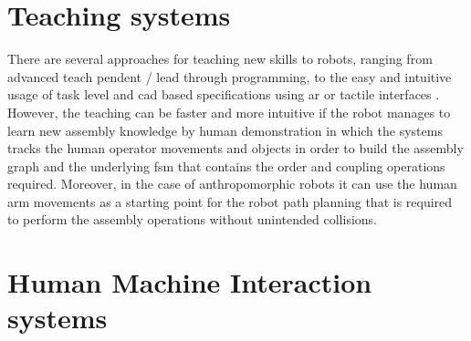 \section{Teaching systems}

There are several approaches for teaching new skills to robots, ranging from advanced teach pendent / lead through programming, to the easy and intuitive usage of task level and \gls{cad} based specifications using \gls{ar} or tactile interfaces \cite{Perzylo2015a}. However, the teaching can be faster and more intuitive if the robot manages to learn new assembly knowledge \cite{tensorflow} by human demonstration \cite{Argall2009,Hamabe2015,Wang2015} in which the systems tracks the human operator movements and objects in order to build the assembly graph and the underlying \gls{fsm} that contains the order and coupling operations required. Moreover, in the case of anthropomorphic robots it can use the human arm movements as a starting point for the robot path planning \cite{Zanchettin2012} that is required to perform the assembly operations without unintended collisions.





\section{Human Machine Interaction systems}

